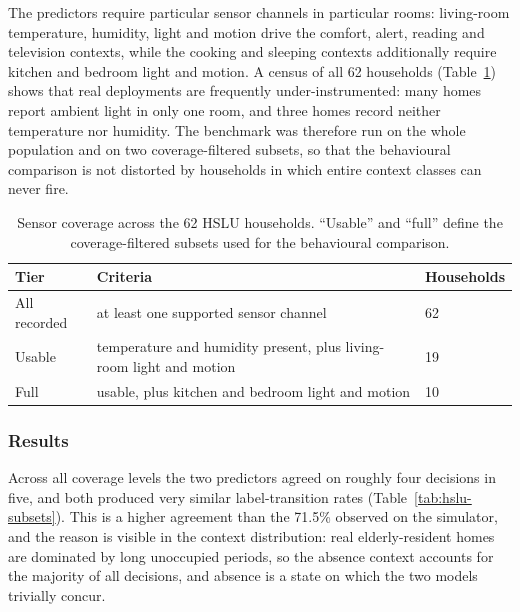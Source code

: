 The predictors require particular sensor channels in particular rooms: living-room
temperature, humidity, light and motion drive the comfort, alert, reading and
television contexts, while the cooking and sleeping contexts additionally require
kitchen and bedroom light and motion. A census of all 62 households
(Table~\ref{tab:hslu-coverage}) shows that real deployments are frequently
under-instrumented: many homes report ambient light in only one room, and three
homes record neither temperature nor humidity. The benchmark was therefore run on
the whole population and on two coverage-filtered subsets, so that the behavioural
comparison is not distorted by households in which entire context classes can
never fire.

\begin{table}[htbp]
\captionsetup{justification=centering}
\caption{Sensor coverage across the 62 HSLU households. ``Usable'' and ``full''
define the coverage-filtered subsets used for the behavioural comparison.}
\label{tab:hslu-coverage}
\centering
\small
\renewcommand{\arraystretch}{1.2}
\begin{tabular}{@{}p{} p{} p{}@{}}
\hline
\textbf{Tier} & \textbf{Criteria} & \textbf{Households} \\
\hline
All recorded & at least one supported sensor channel & 62 \\
Usable & temperature and humidity present, plus living-room light and motion & 19 \\
Full & usable, plus kitchen and bedroom light and motion & 10 \\
\hline
\end{tabular}
\end{table}

\subsubsection{Results}

Across all coverage levels the two predictors agreed on roughly four decisions in
five, and both produced very similar label-transition rates
(Table~\ref{tab:hslu-subsets}). This is a higher agreement than the 71.5\%
observed on the simulator, and the reason is visible in the context distribution:
real elderly-resident homes are dominated by long unoccupied periods, so the
absence context accounts for the majority of all decisions, and absence is a state
on which the two models trivially concur.

